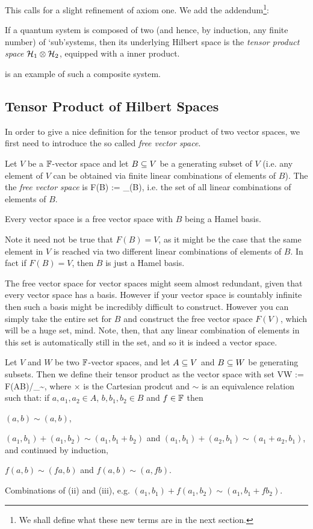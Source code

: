 This calls for a slight refinement of axiom one. We add the addendum\footnote{We shall define what these new terms are in the next section.}: 

\begin{tcolorbox}[colframe=blue!10!black,before skip=10pt,after skip=10pt]
If a quantum system is composed of two (and hence, by induction, any finite number) of `sub'systems, then its underlying Hilbert space is the \emph{tensor product space} $\mathcal{H}_1\otimes\mathcal{H}_2$, equipped with a inner product.
\end{tcolorbox}

\be 
{} is an example of such a composite system.
\ee 

\subsection{Tensor Product of Hilbert Spaces}

In order to give a nice definition for the tensor product of two vector spaces, we first need to introduce the so called \emph{free vector space}.

\bd 
Let $V$ be a $\mathbb{F}$-vector space and let $B\subseteq V$ be a generating subset of $V$ (i.e. any element of $V$ can be obtained via finite linear combinations of elements of $B$). The the \emph{free vector space} is 
\bse 
F(B) := _{\F}(B),
\ese 
i.e. the set of all linear combinations of elements of $B$.
\ed 

\bl 
Every vector space is a free vector space with $B$ being a Hamel basis.
\el 

\br 
\label{rem:F(B)notV}
Note it need not be true that $F(B)=V$, as it might be the case that the same element in $V$ is reached via two different linear combinations of elements of $B$. In fact if $F(B)=V$, then $B$ is just a Hamel basis.
\er 

The free vector space for vector spaces might seem almost redundant, given that every vector space has a basis. However if your vector space is countably infinite then such a basis might be incredibly difficult to construct. However you can simply take the entire set for $B$ and construct the free vector space $F(V)$, which will be a huge set, mind. Note, then, that any linear combination of elements in this set is automatically still in the set, and so it is indeed a vector space.

\bd 
Let $V$ and $W$ be two $\mathbb{F}$-vector spaces, and let $A\subseteq V$ and $B\subseteq W$ be generating subsets. Then we define their tensor product as the vector space with set 
\bse 
V\otimes W := F(A\times B)/_{\sim},
\ese 
where $\times$ is the Cartesian prodcut and $\sim$ is an equivalence relation such that: if $a,a_1,a_2\in A$, $b,b_1,b_2\in B$ and $f\in\mathbb{F}$ then 
\ben[label=(\roman*)]
\item $(a,b)\sim(a,b)$, 
\item $(a_1,b_1) + (a_1,b_2) \sim (a_1,b_1+b_2)$ and $(a_1,b_1) + (a_2,b_1) \sim (a_1+a_2,b_1)$, and continued by induction,
\item $f(a,b) \sim (fa,b)$ and $f(a,b)\sim(a,fb)$. 
\item Combinations of (ii) and (iii), e.g. $(a_1,b_1)+f(a_1,b_2) \sim (a_1,b_1+fb_2)$. 
\een 
\ed 

